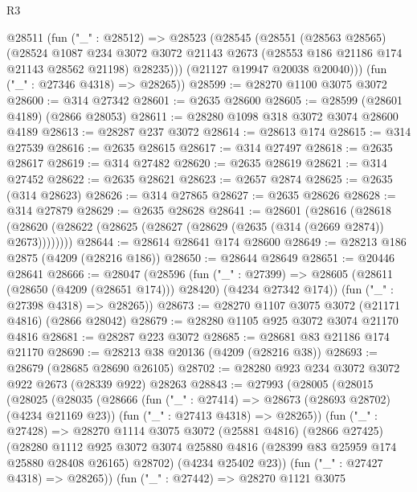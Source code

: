 \begin{lexlean}{R3}
\begin{coremodule}
      @28511
        (fun ("_" : @28512) =>
        @28523
          (@28545
            (@28551
              (@28563 @28565)
              (@28524
                @1087
                @234
                @3072
                @3072
                @21143
                @2673
                (@28553 @186 @21186 @174 @21143 @28562 @21198)
                @28235)))
          (@21127 @19947 @20038 @20040)))
      (fun ("_" : @27346 @4318) => @28265))
@28599 := @28270 @1100 @3075 @3072
@28600 := @314 @27342
@28601 := @2635 @28600
@28605 := @28599 (@28601 @4189) (@2866 @28053)
@28611 := @28280 @1098 @318 @3072 @3074 @28600 @4189
@28613 := @28287 @237 @3072
@28614 := @28613 @174
@28615 := @314 @27539
@28616 := @2635 @28615
@28617 := @314 @27497
@28618 := @2635 @28617
@28619 := @314 @27482
@28620 := @2635 @28619
@28621 := @314 @27452
@28622 := @2635 @28621
@28623 := @2657 @2874
@28625 := @2635 (@314 @28623)
@28626 := @314 @27865
@28627 := @2635 @28626
@28628 := @314 @27879
@28629 := @2635 @28628
@28641 := @28601
    (@28616
      (@28618 (@28620 (@28622 (@28625 (@28627 (@28629 (@2635 (@314 (@2669 @2874)) @2673))))))))
@28644 := @28614 @28641 @174 @28600
@28649 := @28213 @186 @2875 (@4209 (@28216 @186))
@28650 := @28644 @28649
@28651 := @20446 @28641
@28666 := @28047
    (@28596
      (fun ("_" : @27399) =>
      @28605 (@28611 (@28650 (@4209 (@28651 @174))) @28420) (@4234 @27342 @174))
      (fun ("_" : @27398 @4318) => @28265))
@28673 := @28270 @1107 @3075 @3072 (@21171 @4816) (@2866 @28042)
@28679 := @28280 @1105 @925 @3072 @3074 @21170 @4816
@28681 := @28287 @223 @3072
@28685 := @28681 @83 @21186 @174 @21170
@28690 := @28213 @38 @20136 (@4209 (@28216 @38))
@28693 := @28679 (@28685 @28690 @26105)
@28702 := @28280 @923 @234 @3072 @3072 @922 @2673 (@28339 @922) @28263
@28843 := @27993
    (@28005
      (@28015
        (@28025
          (@28035
            (@28666
              (fun ("_" : @27414) => @28673 (@28693 @28702) (@4234 @21169 @23))
              (fun ("_" : @27413 @4318) => @28265))
            (fun ("_" : @27428) =>
            @28270
              @1114
              @3075
              @3072
              (@25881 @4816)
              (@2866 @27425)
              (@28280
                @1112
                @925
                @3072
                @3074
                @25880
                @4816
                (@28399 @83 @25959 @174 @25880 @28408 @26165)
                @28702)
              (@4234 @25402 @23))
            (fun ("_" : @27427 @4318) => @28265))
          (fun ("_" : @27442) =>
          @28270
            @1121
            @3075

\end{coremodule}
\end{lexlean}
